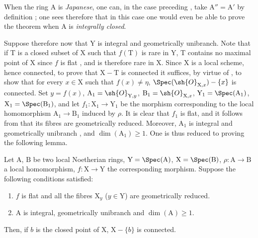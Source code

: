 \begin{remark}[18.9.7.1]
\label{IV.18.9.7.1}
When the ring A is \emph{Japanese}, one can, in the case preceding , take $\mathrm{A}''=\mathrm{A}'$ by definition ;
one sees therefore that in this case one would even be able to prove the theorem when A is \emph{integrally closed}.
\end{remark}

\begin{env}[18.9.7.2]
\label{IV.18.9.7.2}
Suppose therefore now that Y is integral and geometrically unibranch.
Note that if T is a closed subset of X such that $f(\mathrm{T})$ is rare in Y, T contains no maximal point of X since $f$ is flat , and is therefore rare in X.
Since X is a local scheme, hence connected, to prove that $\mathrm{X}-\mathrm{T}$ is connected it suffices, by virtue of , to show that for every $x\in\mathrm{X}$ such that $f(x)\neq\eta$, $\Spec(\sh{O}_{\mathrm{X},x})-\{x\}$ is connected.
Set $y=f(x)$, $\mathrm{A}_1=\sh{O}_{\mathrm{Y},y}$, $\mathrm{B}_1=\sh{O}_{\mathrm{X},x}$, $\mathrm{Y}_1=\Spec(\mathrm{A}_1)$, $\mathrm{X}_1=\Spec(\mathrm{B}_1)$, and let $f_1:\mathrm{X}_1\to\mathrm{Y}_1$ be the morphism corresponding to the local homomorphism $\mathrm{A}_1\to\mathrm{B}_1$ induced by $\rho$.
It is clear that $f_1$ is flat, and it follows from  that its fibres are geometrically reduced.
Moreover, $\mathrm{A}_1$ is integral and geometrically unibranch , and $\dim(\mathrm{A}_1)\geq 1$.
One is thus reduced to proving the following lemma.
\end{env}

\begin{lemma}[18.9.7.3]
\label{IV.18.9.7.3}
Let $\mathrm{A}$, $\mathrm{B}$ be two local Noetherian rings, $\mathrm{Y}=\Spec(\mathrm{A})$, $\mathrm{X}=\Spec(\mathrm{B})$, $\rho:\mathrm{A}\to\mathrm{B}$ a local homomorphism, $f:\mathrm{X}\to\mathrm{Y}$ the corresponding morphism.
Suppose the following conditions satisfied:
\begin{enumerate}[label=\emph{\roman*)}]
  \item $f$ is flat and all the fibres $\mathrm{X}_y$ ($y\in\mathrm{Y}$) are geometrically reduced.
  \item A is integral, geometrically unibranch and $\dim(\mathrm{A})\geq 1$.
\end{enumerate}
Then, if $b$ is the closed point of $\mathrm{X}$, $\mathrm{X}-\{b\}$ is connected.
\end{lemma}

